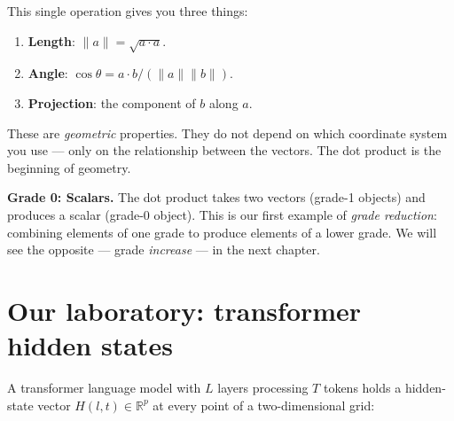 \documentclass[11pt, twoside, openright]{memoir}
\newcommand{\ip}{\cdot}           %
\numberwithin{equation}{chapter}
\begin{document}
This single operation gives you three things:
\begin{enumerate}[nosep]
\item \textbf{Length}: $\|a\| = \sqrt{a \ip a}$.
\item \textbf{Angle}: $\cos\theta = a \ip b / (\|a\| \|b\|)$.
\item \textbf{Projection}: the component of $b$ along $a$.
\end{enumerate}

These are \emph{geometric} properties.  They do not depend on which
coordinate system you use --- only on the relationship between the
vectors.  The dot product is the beginning of geometry.

\begin{gabox}
\textbf{Grade 0: Scalars.}
The dot product takes two vectors (grade-1 objects) and produces a
scalar (grade-0 object).  This is our first example of \emph{grade
reduction}: combining elements of one grade to produce elements of a
lower grade.  We will see the opposite --- grade \emph{increase} --- in
the next chapter.
\end{gabox}

\section{Our laboratory: transformer hidden states}

A transformer language model with $L$ layers processing $T$ tokens holds
a hidden-state vector $H(l, t) \in \mathbb{R}^p$ at every point of a
two-dimensional grid:

\begin{center}
\end{center}
\end{document}
